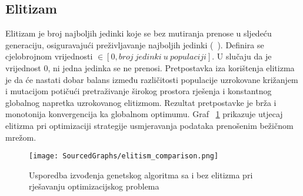 \subsection{Elitizam}
Elitizam je broj najboljih jedinki koje se bez mutiranja prenose u sljedeću generaciju, osiguravajući preživljavanje najboljih jedinki (~\cite{elitism}).
Definira se cjelobrojnom vrijednosti $\in [0, broj\ jedinki\ u\ populaciji]$.
U slučaju da je vrijednost 0, ni jedna jedinka se ne prenosi.
Pretpostavka iza korištenja elitizma je da će nastati dobar balans između različitosti populacije uzrokovane križanjem i mutacijom potičući pretraživanje širokog prostora rješenja i konstantnog globalnog napretka uzrokovanog elitizmom.
Rezultat pretpostavke je brža i monotonija konvergencija ka globalnom optimumu.
Graf ~\ref{fig:elitism} prikazuje utjecaj elitizma pri optimizaciji strategije usmjeravanja podataka prenošenim bežičnom mrežom.

\begin{figure}
	\centering
	\texttt{[image: SourcedGraphs/elitism\_comparison.png]}
	\caption{Usporedba izvođenja genetskog algoritma sa i bez elitizma pri rješavanju optimizacijskog problema}
	\label{fig:elitism}
\end{figure}


